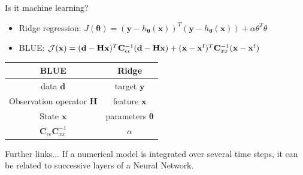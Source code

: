 \documentclass[handout]{beamer}
\begin{document}
\begin{frame}{Is it machine learning?}
\begin{footnotesize}

    \begin{itemize}
        \item Ridge regression: $
J(\bm{\theta}) =(\mathbf{y} - h_{\bm{\theta}}(\mathbf{x}))^T (\mathbf{y} - h_{\bm{\theta}}(\mathbf{x})) + \alpha  \theta^T \theta
$
\item BLUE:  $\mathcal{J}(\mathbf{x}) = 
          (\mathbf{d} - \mathbf{H}\mathbf{x})^T  \mathbf{C}_{\epsilon \epsilon}^{-1}  (\mathbf{d} - \mathbf{H}\mathbf{x}) + (\mathbf{x} - \mathbf{x}^{\rm f})^T \mathbf{C}^{-1}_{xx}(\mathbf{x} - \mathbf{x}^{\rm f})$
    \end{itemize}
    \end{footnotesize}
    \pause
    \begin{table}[]
        \centering
        \begin{tabular}{c|c}
            BLUE & Ridge \\
            \hline
            data $\mathbf{d}$ & target $\mathbf{y}$  \\
            Observation operator $\mathbf{H}$ & feature $\mathbf{x}$ \\
            State $\mathbf{x}$ & parameters $\bm{\theta}$\\
            $\mathbf{C}_{\epsilon \epsilon} \mathbf{C}^{-1}_{xx}$ & $\alpha$
        \end{tabular}
    \end{table}
    \pause
    \begin{block}{Further links...}
    If a numerical model is integrated over several time steps, it can be related to successive layers of a Neural Network.
    \end{block}
\end{frame}
\end{document}
